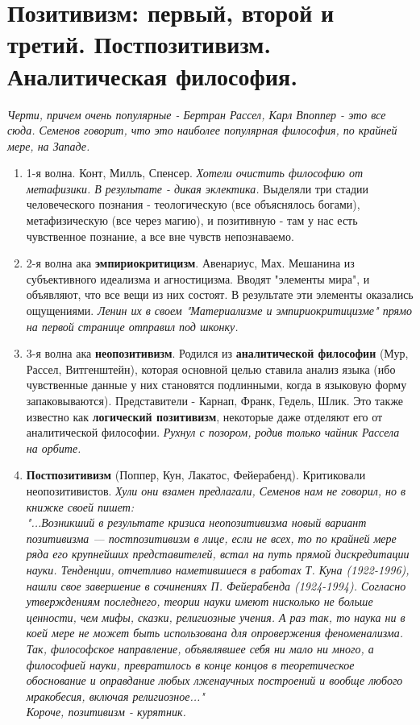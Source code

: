 \documentclass[12pt,a4paper]{article}
\begin{document}
\section{Позитивизм: первый, второй и третий. Постпозитивизм. Аналитическая философия.}
\textit{Черти, причем очень популярные - Бертран Рассел, Карл Впоппер - это все сюда. Семенов говорит, что это наиболее популярная философия, по крайней мере, на Западе.}
\begin{enumerate}

\item 1-я волна. Конт, Милль, Спенсер.
\textit{Хотели очистить философию от метафизики. В результате - дикая эклектика.} 
Выделяли три стадии человеческого познания - теологическую (все объяснялось богами), метафизическую (все через магию), и позитивную - там у нас есть чувственное познание, а все вне чувств непознаваемо.
\item 2-я волна ака \textbf{эмпириокритицизм}. Авенариус, Мах.
Мешанина из субъективного идеализма и агностицизма. Вводят "элементы мира", и объявляют, что все вещи из них состоят. В результате эти элементы оказались ощущениями. \textit{Ленин их в своем "Материализме и эмпириокритицизме" прямо на первой странице отправил под шконку.}
\item 3-я волна ака \textbf{неопозитивизм}. Родился из \textbf{аналитической философии} (Мур, Рассел, Витгенштейн), которая основной целью ставила  анализ языка (ибо чувственные данные у них становятся подлинными, когда в языковую форму запаковываются). Представители - Карнап, Франк, Гедель, Шлик. Это также известно как \textbf{логический позитивизм}, некоторые даже отделяют его от аналитической философии. \textit{Рухнул с позором, родив только чайник Рассела на орбите.}
\item \textbf{Постпозитивизм} (Поппер, Кун, Лакатос, Фейерабенд). Критиковали неопозитивистов.
\textit{Хули они взамен предлагали, Семенов нам не говорил, но в книжке своей пишет:\\
"...Возникший в результате кризиса неопозитивизма новый вариант позитивизма —
постпозитивизм в лице, если не всех, то по крайней мере ряда его крупнейших
представителей, встал на путь прямой дискредитации науки. Тенденции, отчетливо
наметившиеся в работах Т. Куна (1922-1996), нашли свое завершение в сочинениях
П. Фейерабенда (1924-1994). Согласно утверждениям последнего, теории науки
имеют нисколько не больше ценности, чем мифы, сказки, религиозные учения. А
раз так, то наука ни в коей мере не может быть использована для опровержения
феноменализма. Так, философское направление, объявлявшее себя ни мало ни
много, а философией науки, превратилось в конце концов в теоретическое
обоснование и оправдание любых лженаучных построений и вообще любого
мракобесия, включая религиозное..."\\
Короче, позитивизм - курятник.
}
\end{enumerate}
\end{document}
